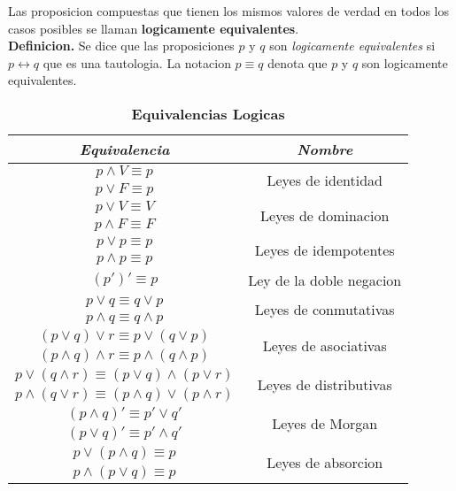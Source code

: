 \documentclass[]{article}
\begin{document}
Las proposicion compuestas que tienen los mismos valores de verdad en todos los casos posibles se llaman \textbf{logicamente equivalentes}.\\

\textbf{Definicion.} Se dice que las proposiciones $p$ y $q$ son \textit{logicamente equivalentes} si $p \leftrightarrow q$ que es una tautologia. La notacion $p \equiv q$ denota que $p$ y $q$ son logicamente equivalentes.

\begin{table}[H]
	\caption*{\textbf{Equivalencias Logicas}}
	\parbox{.5\linewidth}{
	\begin{center}
		\label{tab:equivalencias-logicas}
		\begin{tabular}{|c|c|}
			\hline
			\textit{Equivalencia} & \textit{Nombre} \\
			\hline
			$p\wedge V \equiv p$ & \multirow{2}{*}{Leyes de identidad} \\
			$p\vee F \equiv p$ & \\
			\hline
			$p\vee V \equiv V$ & \multirow{2}{*}{Leyes de dominacion} \\
			$p\wedge F \equiv F$ & \\
			\hline
			$p\vee p \equiv p$ & \multirow{2}{*}{Leyes de idempotentes} \\
			$p\wedge p \equiv p$ & \\
			\hline
			$(p')' \equiv p$ & Ley de la doble negacion\\
			\hline
			$p\vee q \equiv q\vee p$ & \multirow{2}{*}{Leyes de conmutativas} \\
			$p\wedge q \equiv q\wedge p$ & \\
			\hline
			$(p\vee q)\vee r \equiv p \vee(q\vee p)$ & \multirow{2}{*}{Leyes de asociativas} \\
			$(p\wedge q)\wedge r \equiv p \wedge(q\wedge p)$ & \\
			\hline
			$p \vee (q \wedge r) \equiv (p\vee q) \wedge (p \vee r)$ & \multirow{2}{*}{Leyes de distributivas} \\
			$p \wedge (q \vee r) \equiv (p \wedge q) \vee (p \wedge r)$ & \\
			\hline
			$(p \wedge q)' \equiv p' \vee q'$ & \multirow{2}{*}{Leyes de Morgan} \\
			$(p \vee q)' \equiv p' \wedge q'$ & \\
			\hline
			$p \vee (p \wedge q) \equiv p$ & \multirow{2}{*}{Leyes de absorcion} \\
			$p \wedge (p \vee q) \equiv p$ & \\

\end{tabular}
\end{center}}
\end{table}
\end{document}

